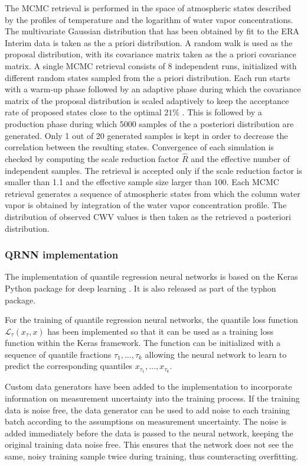 \documentclass[journal abbreviation, manuscript]{copernicus}
\begin{document}
  The MCMC retrieval is performed in the space of atmospheric states described
  by the profiles of temperature and the logarithm of water vapor
  concentrations. The multivariate Gaussian distribution that has been obtained
  by fit to the ERA Interim data is taken as the a priori distribution. A random
  walk is used as the proposal distribution, with its covariance matrix taken as
  the a priori covariance matrix. A single MCMC retrieval consists of 8
  independent runs, initialized with different random states sampled from the a
  priori distribution. Each run starts with a warm-up phase followed by an
  adaptive phase during which the covariance matrix of the proposal distribution
  is scaled adaptively to keep the acceptance rate of proposed states close to
  the optimal $21\%$ \citep{bda}. This is followed by a production phase during
  which 5000 samples of the a posteriori distribution are generated. Only 1 out
  of 20 generated samples is kept in order to decrease the correlation between
  the resulting states. Convergence of each simulation is checked by computing
  the scale reduction factor $\hat{R}$ and the effective number of independent
  samples. The retrieval is accepted only if the scale reduction factor is
  smaller than 1.1 and the effective sample size larger than 100. Each MCMC
  retrieval generates a sequence of atmospheric states from which the column
  water vapor is obtained by integration of the water vapor concentration
  profile. The distribution of observed CWV values is then taken as the
  retrieved a posteriori distribution.

  
\subsubsection{QRNN implementation}
\label{sec:implementation_qrnn}

  The implementation of quantile regression neural networks is based on the
  Keras Python package for deep learning \citep{keras}. It is also released
  as part of the typhon package.

  For the training of quantile regression neural networks, the quantile loss
  function $\mathcal{L}_\tau(x_\tau, x)$ has been implemented so that it can be
  used as a training loss function within the Keras framework. The function can
  be initialized with a sequence of quantile fractions $\tau_1, \ldots,
  \tau_k$ allowing the neural network to learn to predict the corresponding
  quantiles $x_{\tau_1}, \ldots, x_{\tau_k}$.

  Custom data generators have been added to the implementation  to incorporate
   information on measurement uncertainty into the training
  process. If the training data is noise free, the data generator can be used to
  add noise to each training batch according to the assumptions on measurement
  uncertainty. The noise is added immediately  before the data is passed to the
  neural network, keeping the original training data noise free. This ensures
  that the network does not see the same, noisy training sample twice during
  training, thus counteracting overfitting.
\end{document}
